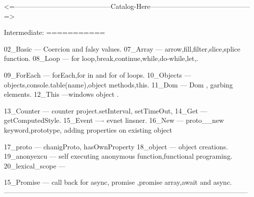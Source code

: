 <=------------------------------------------Catalog-Here--------------------------------------------=>



Intermediate:
===========

02_Basic --- Coercion and falsy values.
07_Array --- arrow,fill,filter,slice,splice function.
08_Loop --- for loop,break,continue,while,do-while,let,.

09_ForEach --- forEach,for in and for of loops.
10_Objects --- objects,console.table(name),object methods,this.
11_Dom --- Dom , garbing elements.
12_This ---windows object .

13_Counter --- counter project.setInterval, setTimeOut,
14_Get --- getComputedStyle.
15_Event ---- evnet linsner.
16_New --- proto__new keyword,prototype, adding properties on existing object

17_proto --- chanigProto, hasOwnProperty
18_object ---  object creations.
19_anonyexcu --- self executing anonymous function,functional programing.
20_lexical_scope ---


15_Promise --- call back for async, promise ,promise array,await and async.
----------------------------------------------------------------------------------------------------------- 

